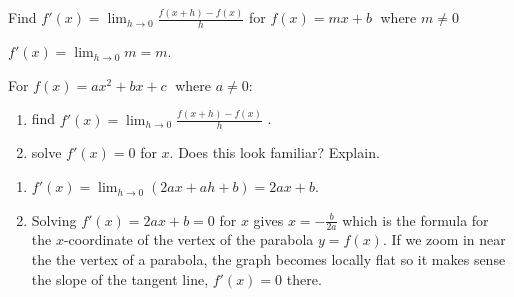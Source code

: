 \documentclass{ximera}
\begin{document}
\begin{problem}
Find $f'(x) = \lim_{h \rightarrow 0} \frac{f(x+h) - f(x)}{h}$  for $f(x) = mx + b\;$ where $m \neq 0$

\begin{solution}
 $f'(x) = \lim_{h \rightarrow 0} m= m$.
\end{solution}
\end{problem}

\begin{problem}\label{quadraticderivativeformulaexercise} For  $f(x) = ax^{2} + bx + c\;$ where $a \neq 0$: 

\begin{enumerate}

\item find $f'(x) = \lim_{h \rightarrow 0} \frac{f(x+h) - f(x)}{h}$   .

\item  solve $f'(x) = 0$ for $x$.  Does this look familiar?  Explain.

\end{enumerate}

\begin{solution}
\begin{enumerate} 

\item  $f'(x) = \lim_{h \rightarrow 0} (2ax + ah + b) = 2ax + b$.

\item  Solving $f'(x) = 2ax + b = 0$ for $x$ gives $x = -\frac{b}{2a}$ which is the formula for the $x$-coordinate of the vertex of the parabola $y = f(x)$.  If we zoom in near the the vertex of a parabola, the graph becomes locally flat so it makes sense the slope of the tangent line,  $f'(x) = 0$ there. 

\end{enumerate} 
\end{solution}
\end{problem}
\end{document}
